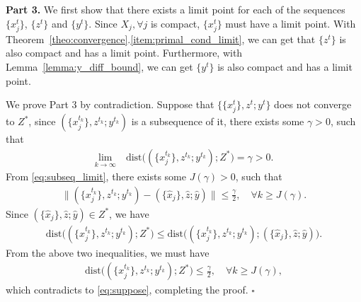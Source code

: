 {\bf Part 3.} We first show that there exists a limit point for each of the sequences $\{x_j^t\}$, $\{z^t\}$ and $\{y^t\}$. Since $X_j, \forall j$ is compact, $\{x_j^t\}$ must have a limit point. With Theorem~\ref{theo:convergence}.\ref{item:primal_cond_limit}, we can get that $\{z^t\}$ is also compact and has a limit point. Furthermore, with Lemma~\ref{lemma:y_diff_bound}, we can get $\{y^t\}$ is also compact and has a limit point. 

We prove Part 3 by contradiction.  Suppose that $\{\{x_j^t\}, z^t; y^t\}$ does not converge to $Z^*$, since $(\{x_j^{t_k}\}, z^{t_k}; y^{t_k})$ is a subsequence of it, there exists some $\gamma>0$, such that
\begin{align}
    \underset{k\rightarrow\infty}{\text{lim}}\quad\text{dist}\big((\{x_j^{t_k}\}, z^{t_k}; y^{t_k});Z^*\big)=\gamma>0.\label{eq:suppose}
\end{align}
From \eqref{eq:subseq_limit}, there exists some $J(\gamma)>0$, such that
\begin{align}
        \|(\{x_j^{t_k}\}, z^{t_k}; y^{t_k})- (\{\hat{x}_j\}, \hat{z}; \hat{y})\|\le\frac{\gamma}{2}, \quad\forall k\ge J(\gamma).
\end{align}
Since $(\{\hat{x}_j\}, \hat{z}; \hat{y})\in Z^*$, we have
\begin{align}
    \text{dist}\big((\{x_j^{t_k}\}, z^{t_k}; y^{t_k});Z^*\big) \le \text{dist}\big((\{x_j^{t_k}\}, z^{t_k}; y^{t_k});  (\{\hat{x}_j\}, \hat{z}; \hat{y})\big).
\end{align}
From the above two inequalities, we must have
\begin{align}
    \text{dist}\big((\{x_j^{t_k}\}, z^{t_k}; y^{t_k});Z^*\big)\le\frac{\gamma}{2},\quad\forall k\ge J(\gamma),
\end{align}
which contradicts to \eqref{eq:suppose}, completing the proof.
\hfill$\square$

